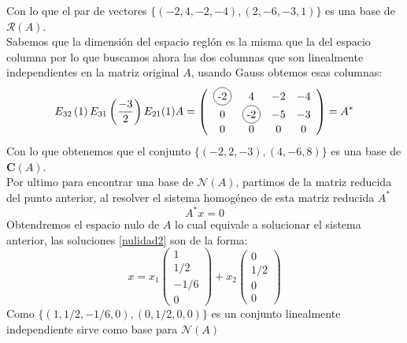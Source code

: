 \documentclass[letter]{memoir} %
\newcommand\Circle[1]{%
  \tikz[baseline=(char.base)]\node[circle,draw,inner sep=2pt] (char) {#1};}
\begin{document}
\begin{enumerate}
Con lo que el par de vectores $\{(-2,4,-2,-4),(2,-6,-3,1)\}$ es una base de $\mathcal{R}(A)$.\\
Sabemos que la dimensión del espacio reglón es la misma que la del espacio columna por lo que buscamos ahora las dos columnas que son linealmente independientes en la matriz original $A$, usando Gauss obtemos esas columnas:
\[
	E_{32}\left( 1 \right) E_{31}\left( \frac{-3}{2}\right) E_{21}(1)  A = \left( 
            \begin{array}{cccc}
            \Circle{-2} & 4 & -2 & -4\\
            0 & \Circle{-2} & -5 & -3\\
            0 & 0 & 0 &0 
            \end{array}
		\right) = A^*
\]
Con lo que obtenemos que el conjunto $\{(-2,2,-3),(4,-6,8)\}$ es una base de $\mathbf{C}(A)$.\\
Por ultimo para encontrar una base de $\mathcal{N}(A)$, partimos de la matriz reducida del punto anterior, al resolver el sistema homogéneo de esta matriz reducida $A^*$ 
\begin{equation}\label{nulidad2}
 A^*x = 0
\end{equation}
Obtendremos el espacio nulo de $A$ lo cual equivale a solucionar el sistema anterior, las soluciones \ref{nulidad2} son de la forma: \\
\[
	x= x_1\left( 
            \begin{array}{c}
             1\\ {1}/{2} \\ {-1}/{6} \\ 0
            \end{array}
		\right) +
        x_2\left( 
            \begin{array}{c}
             0\\ {1}/{2} \\ 0 \\ 0
            \end{array}
		\right)
\]
Como $\{(1,1/2,-1/6,0), (0,1/2,0,0)\}$ es un conjunto linealmente independiente sirve como base para $\mathcal{N}(A)$




\end{enumerate}
\end{document}
